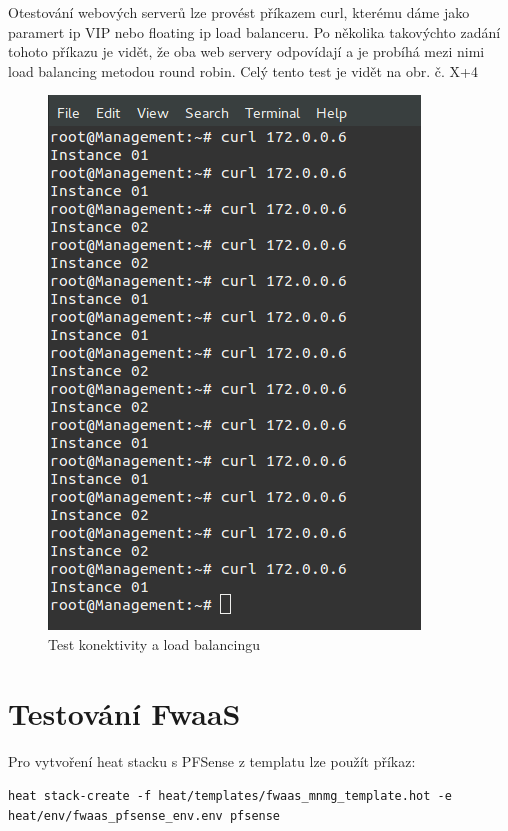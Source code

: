Otestování webových serverů lze provést příkazem curl, kterému dáme jako paramert ip VIP nebo floating ip load balanceru. Po několika takovýchto zadání tohoto příkazu je vidět, že oba web servery odpovídají a je probíhá mezi nimi load balancing metodou round robin.  Celý tento test je vidět na obr. č. X+4

\begin{figure}[h]
\begin{centering}
\includegraphics[scale=0.45]{images/lbaas_testing}
\par\end{centering}
\caption{Test konektivity a load balancingu\label{fig:lbaas_testing}}
\end{figure}



\section{Testování FwaaS}\label{sub:interaction}

Pro vytvoření heat stacku s PFSense z templatu lze použít příkaz:

\verb!heat stack-create -f heat/templates/fwaas_mnmg_template.hot -e heat/env/fwaas_pfsense_env.env pfsense!

